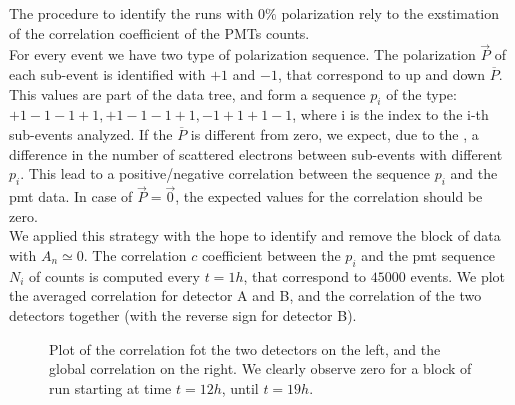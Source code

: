 The procedure to identify the runs with $0\%$ polarization rely to the exstimation of the correlation coefficient of the PMTs counts. \\
For every event we have two type of polarization sequence. The polarization $\vec{P}$ of each sub-event is identified with $+1$ and $-1$, that correspond to up and down $\overline{P}$. This values are part of the data tree, and form a sequence $p_{i}$ of the type: $+1-1-1+1,+1-1-1+1,-1+1+1-1$, where i is the index to the i-th sub-events analyzed. If the $\overline{P}$ is different from zero, we expect, due to the \transv, a difference in the number of scattered electrons between sub-events with different $p_{i}$. This lead to a positive/negative correlation between the sequence $p_{i}$ and the pmt data. In case of $\vec{P} = \vec{0}$, the expected values for the correlation should be zero. \\
We applied this strategy with the hope to identify and remove the block of data with $A_{n} \simeq 0$. The correlation $c$ coefficient between the $p_{i}$ and the pmt sequence $N_{i}$ of counts is computed every $t = 1 h$, that correspond to $45000$ events. We plot the averaged correlation for detector A and B, and the correlation of the two detectors together (with the reverse sign for detector B).

\begin{figure}[hbtp]
\centering
{}
\caption{Plot of the correlation fot the two detectors on the left, and the global correlation on the right. We clearly observe zero for a block of run starting at time $t = 12 h$, until $t = 19 h$.}
\end{figure}

